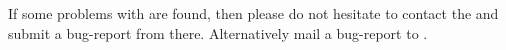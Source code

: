 
If some problems with \period are found, then please do not
hesitate to contact the 
 and submit a bug-report 
from there. Alternatively mail a bug-report to \periodmail.

